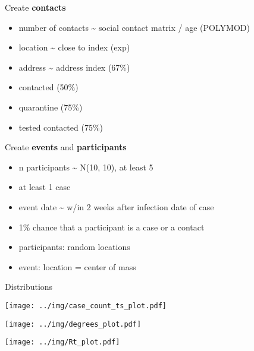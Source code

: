 \documentclass[
  8pt,
  ignorenonframetext,
]{beamer}
\providecommand{\tightlist}{%
  \setlength{\itemsep}{0pt}\setlength{\parskip}{0pt}}
\begin{document}
\begin{frame}
Create \textbf{contacts}

\begin{itemize}
\tightlist
\item
  number of contacts \textasciitilde{} social contact matrix / age
  (POLYMOD)
\item
  location \textasciitilde{} close to index (exp)
\item
  address \textasciitilde{} address index (67\%)
\item
  contacted (50\%)
\item
  quarantine (75\%)
\item
  tested \textbar{} contacted (75\%)
\end{itemize}
\end{frame}

\begin{frame}
Create \textbf{events} and \textbf{participants}

\begin{itemize}
\tightlist
\item
  n participants \textasciitilde{} N(10, 10), at least 5
\item
  at least 1 case
\item
  event date \textasciitilde{} w/in 2 weeks after infection date of case
\item
  1\% chance that a participant is a case or a contact
\item
  participants: random locations
\item
  event: location = center of mass
\end{itemize}
\end{frame}

\begin{frame}{Distributions}
\protect\hypertarget{distributions}{}
\begin{center}
\texttt{[image: ../img/case\_count\_ts\_plot.pdf]}
\end{center}
\end{frame}

\begin{frame}
\begin{center}
\texttt{[image: ../img/degrees\_plot.pdf]}
\end{center}
\end{frame}

\begin{frame}
\begin{center}
\texttt{[image: ../img/Rt\_plot.pdf]}
\end{center}
\end{frame}
\end{document}
